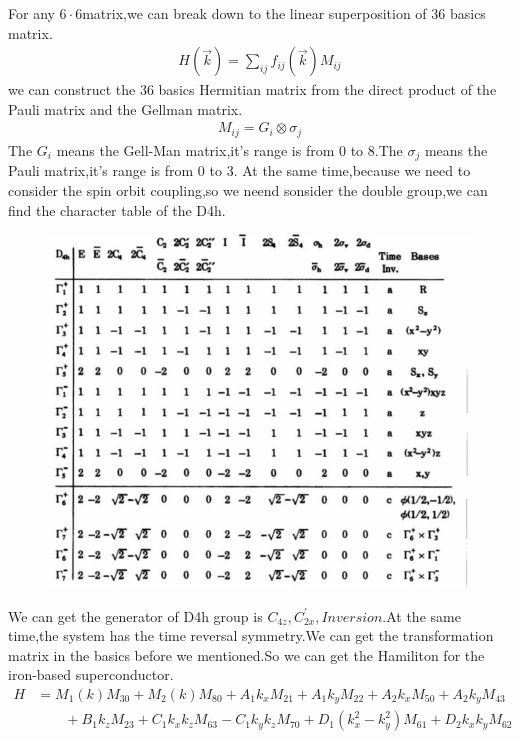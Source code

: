 \documentclass[5pt]{article}
\begin{document}
For any $6\cdot 6$matrix,we can break down to the linear superposition of 36 basics matrix.
\begin{align}
	H(\vec{k})=\sum_{ij}f_{ij}(\vec{k})M_{ij}
\end{align}
we can construct the 36 basics Hermitian matrix from the direct product of the Pauli matrix and the Gellman matrix.
\begin{align}
	M_{ij}=G_i\otimes \sigma_j
\end{align}
The $G_i$ means the Gell-Man matrix,it's range is from 0 to 8.The $\sigma_j$ means the Pauli matrix,it's range is from 0 to 3. 
At the same time,because we need to consider the spin orbit coupling,so we neend sonsider the double group,we can find the character table of the D4h.
\begin{figure}[H]
	\centering
	\includegraphics[scale=0.8]{figure/1}
	\caption{}
	\label{}
\end{figure}
We can get the generator of D4h group is $C_{4z},C_{2x}^{'},Inversion$.At the same time,the system has the time reversal symmetry.We can get the transformation matrix in the basics before we mentioned.So we can get the Hamiliton for the iron-based superconductor.
\begin{align}
	\nonumber
	H&=M_1(k)M_{30}+M_2(k)M_{80}+A_1k_xM_{21}+A_1k_yM_{22}+A_2k_xM_{50}+A_2k_yM_{43}
	\\
	\nonumber  &\qquad +B_1k_zM_{23}+C_1k_xk_zM_{63}-C_1k_yk_zM_{70}+D_1(k_x^2-k_y^2)M_{61}+D_2k_xk_yM_{62}
\end{align}
\end{document}
